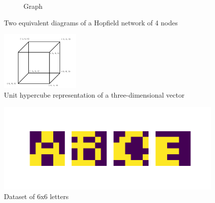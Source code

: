 \documentclass[11pt]{article}
\begin{document}
\begin{figure}[h]
\begin{center}
\begin{subfigure}{0.4\textwidth}
	\caption{Graph}
	\label{fig:netgraph}
	\end{subfigure}
	\caption{Two equivalent diagrams of a Hopfield network of 4 nodes}
	\label{fig:net}
	\end{center}
	\end{figure}

	
	\begin{figure}
	\begin{center}
	\includegraphics[width=0.35\textwidth]{../img/hypercube.png}
	\end{center}
	\caption{Unit hypercube representation of a three-dimensional vector}
	\label{fig:hypercube}
	\end{figure}		

	
	\begin{figure}
	\begin{center}
	\includegraphics[width=1\textwidth]{../img/small_letters.png}
	\caption{Dataset of 6x6 letters}
	\label{fig:smallletters}
	\end{center}	
	\end{figure}
\end{document}
